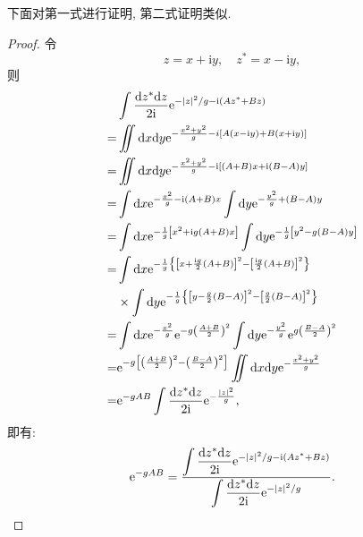下面对第一式进行证明, 第二式证明类似.
\begin{proof}
令
\begin{equation}
z=x+ \mathrm{i}y,\quad z^*=x- \mathrm{i}y,
\end{equation}
则
\begin{align}
&\displaystyle\int \frac{\mathrm{d} z^{*} \mathrm{d} z}{2 \mathrm{i}} \mathrm{e}^{-|z|^{2} / g- \mathrm{i}\left(A z^{*}+B z\right)}\nonumber\\
=&\iint \mathrm{d} x \mathrm{d} y \mathrm{e}^{-\frac{x^{2}+y^{2}}{g}-i[A(x- \mathrm{i}y)+B(x+ \mathrm{i} y)]}\nonumber\\
=&\iint \mathrm{d} x \mathrm{d} y \mathrm{e}^{-\frac{x^{2}+y^{2}}{g}- \mathrm{i}[(A+B) x+ \mathrm{i}(B-A) y]}\nonumber\\
=&\int \mathrm{d} x \mathrm{e}^{-\frac{x^{2}}{g}- \mathrm{i}(A+B) x} \int \mathrm{d} y \mathrm{e}^{-\frac{y^2}{g}+(B-A) y}\nonumber\\
=&\int \mathrm{d} x \mathrm{e}^{-\frac{1}{g}\left[x^{2}+ \mathrm{i} g(A+B) x\right]} \int \mathrm{d} y \mathrm{e}^{-\frac{1}{g}\left[y^{2}-g(B-A) y\right]}\nonumber\\
=&\int \mathrm{d} x \mathrm{e}^{-\frac{1}{g}\left\{\left[x+\frac{ \mathrm{i}g}{2}(A+B)\right]^2-\left[\frac{ \mathrm{i}g}{2}(A+B)\right]^2\right\} }\nonumber\\
 &\times\int \mathrm{d} y \mathrm{e}^{-\frac{1}{g}\left\{\left[y-\frac{g}{2}(B-A)\right]^2-\left[\frac{g}{2}(B-A)\right]^2\right\} }\nonumber\\
=&\int \mathrm{d} x \mathrm{e}^{-\frac{x^{2}}{g}}\mathrm{e}^{-g\left(\frac{A+B}{2}\right)^2} \int \mathrm{d} y \mathrm{e}^{-\frac{y^2}{g}}\mathrm{e}^{g\left(\frac{B-A}{2}\right)^2}\nonumber\\
=&\mathrm{e}^{-g\left[\left(\frac{A+B}{2}\right)^2-\left(\frac{B-A}{2}\right)^2\right]}\iint \mathrm{d} x \mathrm{d} y \mathrm{e}^{-\frac{x^{2}+y^{2}}{g}}\nonumber\\
=&\mathrm{e}^{-gA B} \int \frac{\mathrm{d} z^{*} \mathrm{d} z}{2  \mathrm{i}} \mathrm{e}^{-\frac{|z|^{2}}{g}},
\end{align}
即有:
\begin{equation}
\mathrm{e}^{-g A B}=\frac{\displaystyle\int \frac{\mathrm{d} z^{*} \mathrm{d} z}{2 \mathrm{i}} \mathrm{e}^{-|z|^{2} / g- \mathrm{i}\left(A z^{*}+B z\right)} }{ \displaystyle\int \frac{\mathrm{d} z^{*} \mathrm{d} z}{2  \mathrm{i}} \mathrm{e}^{-|z|^{2} / g}}.
\end{equation}
\end{proof}

